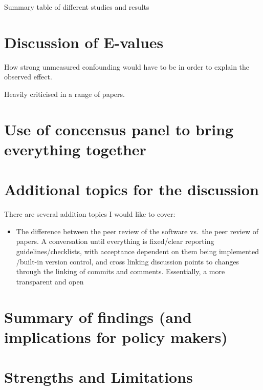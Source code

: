 \documentclass[a4paper, twoside]{templates/ociamthesis}
\providecommand{\tightlist}{%
  \setlength{\itemsep}{0pt}\setlength{\parskip}{0pt}}
\begin{document}
Summary table of different studies and results

\hypertarget{discussion-of-e-values}{%
\section{Discussion of E-values}\label{discussion-of-e-values}}

How strong unmeasured confounding would have to be in order to explain the observed effect.

Heavily criticised in a range of papers.

\hypertarget{use-of-concensus-panel-to-bring-everything-together}{%
\section{Use of concensus panel to bring everything together}\label{use-of-concensus-panel-to-bring-everything-together}}

\hypertarget{additional-topics-for-the-discussion}{%
\section{Additional topics for the discussion}\label{additional-topics-for-the-discussion}}

There are several addition topics I would like to cover:

\begin{itemize}
\tightlist
\item
  The difference between the peer review of the software vs.~the peer review of papers. A conversation until everything is fixed/clear reporting guidelines/checklists, with acceptance dependent on them being implemented /built-in version control, and cross linking discussion points to changes through the linking of commits and comments. Essentially, a more transparent and open
\end{itemize}

\hypertarget{summary-of-findings-and-implications-for-policy-makers}{%
\section{Summary of findings (and implications for policy makers)}\label{summary-of-findings-and-implications-for-policy-makers}}

\hypertarget{strengths-and-limitations-1}{%
\section{Strengths and Limitations}\label{strengths-and-limitations-1}}
\end{document}
